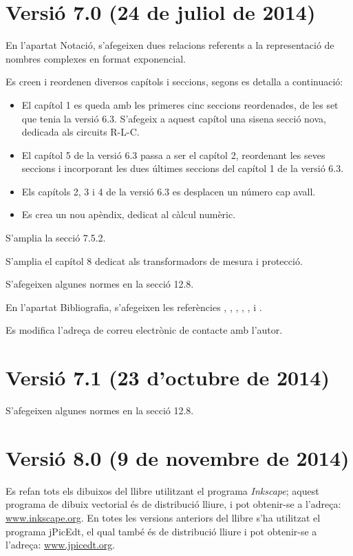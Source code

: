 \section*{Versió 7.0 (24 de juliol de 2014)}

En l'apartat Notació, s'afegeixen dues  relacions referents a la representació de nombres complexes en format exponencial.

Es creen i reordenen diversos capítols i seccions, segons es detalla a continuació:
\begin{itemize}
   \item El capítol 1 es queda amb les primeres cinc seccions reordenades, de les set que tenia la versió 6.3. S'afegeix a aquest capítol una sisena secció nova, dedicada als circuits R-L-C.
   \item El capítol 5 de la versió 6.3 passa a ser el capítol 2, reordenant les seves seccions i incorporant les dues últimes seccions del capítol 1 de la versió 6.3.
   \item Els capítols 2, 3 i 4  de la versió 6.3 es desplacen un número cap avall.
   \item Es crea un nou apèndix, dedicat al càlcul numèric.
\end{itemize}

S'amplia la secció 7.5.2.

S'amplia el capítol 8 dedicat als transformadors de mesura i protecció.

S'afegeixen algunes normes en la secció 12.8.

En l'apartat Bibliografia, s'afegeixen les referències \cite{GOM}, \cite{SPK}, \cite{JDH}, \cite{EJB},  \cite{PMA}, \cite{MAI} i \cite{KNU}.

Es modifica l'adreça de correu electrònic de contacte amb l'autor.


\section*{Versió 7.1 (23 d'octubre de 2014)}

S'afegeixen algunes normes en la secció 12.8.


\section*{Versió 8.0 (9 de novembre de 2014)}

Es refan tots els dibuixos del llibre utilitzant el programa \emph{Inkscape}; aquest programa de dibuix vectorial és de distribució lliure, i pot obtenir-se a l'adreça: \href{http://www.inkscape.org/}{www.inkscape.org}. En totes les versions anteriors del llibre s'ha utilitzat el programa jPicEdt, el qual també és de distribució lliure i pot obtenir-se a l'adreça: \href{http://www.jpicedt.org/}{www.jpicedt.org}.


